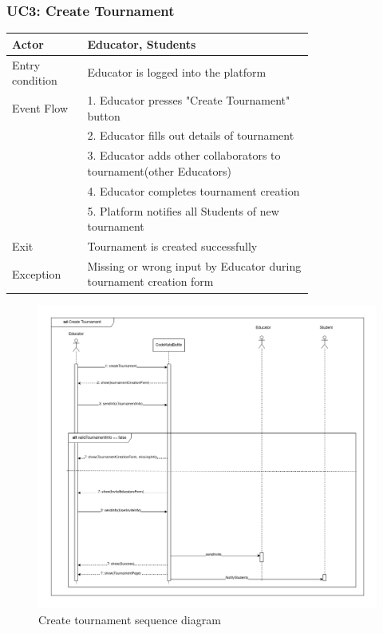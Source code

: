 \newpage
\subsubsection{UC3: Create Tournament}
\begin{center}
    \begin{longtable}{lp{0.75\linewidth}}
        \hline
            Actor & Educator, Students\\
        \hline
            Entry condition & Educator is logged into the platform\\
        \hline
            Event Flow &  1. Educator presses "Create Tournament" button\\
                       &  2. Educator fills out details of tournament\\
                       &  3. Educator adds other collaborators to tournament(other Educators)\\
                       &  4. Educator completes tournament creation\\
                       &  5. Platform notifies all Students of new tournament\\
        \hline
            Exit & Tournament is created successfully \\
        \hline
            Exception & Missing or wrong input by Educator during tournament creation form\\
        \hline
    \end{longtable}
\end{center}

\begin{figure}[H]
    \centering
    \includegraphics[width=1\linewidth]{misc//Images//UC Diagrams/UC3.png}
    \caption{Create tournament sequence diagram}
    \label{fig:enter-label}
\end{figure}

